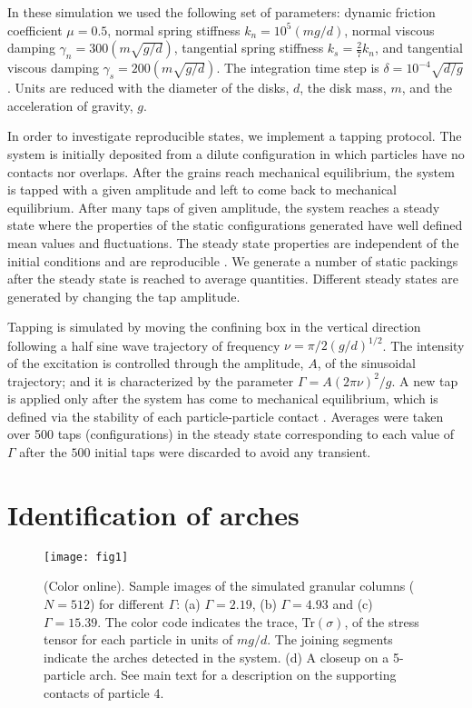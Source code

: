 In these simulation we used the following set of parameters: dynamic friction coefficient $\mu = 0.5$, normal spring stiffness $k_n = 10^5 (mg/d)$, normal viscous damping $\gamma_n = 300 (m\sqrt{g/d})$, tangential spring stiffness $k_s= \frac{2}{7}k_n$, and tangential viscous damping $\gamma_s = 200 (m\sqrt{g/d})$. The integration time step is $\delta = 10^{-4} \sqrt{d/g}$. Units are reduced with the diameter of the disks, $d$, the disk mass, $m$, and the acceleration of gravity, $g$.

In order to investigate reproducible states, we implement a tapping protocol. The system is initially deposited from a dilute configuration in which particles have no contacts nor overlaps. After the grains reach mechanical equilibrium, the system is tapped with a given amplitude and left to come back to mechanical equilibrium. After many taps of given amplitude, the system reaches a steady state where the properties of the static configurations generated have well defined mean values and fluctuations. The steady state properties are independent of the initial conditions and are reproducible \cite{pugnaloni1,ribiere,pugnaloni5}. We generate a number of static packings after the steady state is reached to average quantities. Different steady states are generated by changing the tap amplitude.
 
Tapping is simulated by moving the confining box in the vertical direction following a half sine wave trajectory of frequency $\nu = \pi /2 (g/d)^{1/2}$. The intensity of the excitation is controlled through the amplitude, $A$, of the sinusoidal trajectory; and it is characterized by the parameter $\Gamma = A (2\pi\nu)^2/g$. A new tap is applied only after the system has come to mechanical equilibrium, which is defined via the stability of each particle-particle contact \cite{arevalo}. Averages were taken over 500 taps (configurations) in the steady state corresponding to each value of $\Gamma$ after the $500$ initial taps were discarded to avoid any transient.

\section{Identification of arches}

\begin{figure}[b]
\centering
\texttt{[image: fig1]}
\caption {(Color online). Sample images of the simulated granular columns ($N=512$) for different $\Gamma$: (a) $\Gamma = 2.19$, (b) $\Gamma = 4.93$ and (c) $\Gamma = 15.39$. The color code indicates the trace, Tr$(\sigma)$, of the stress tensor for each particle in units of $mg/d$. The joining segments indicate the arches detected in the system. (d) A closeup on a 5-particle arch. See main text for a description on the supporting contacts of particle 4.}
\label{fig1}
\end{figure}

